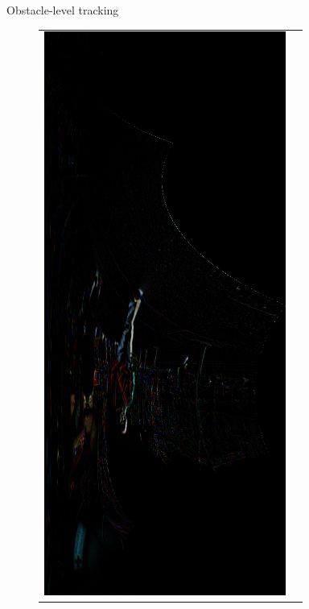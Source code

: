 \begin{frame}[plain]{Obstacle-level tracking}
\begin{overlayarea}{\textwidth}{\textheight}
{\begin{figure}
\begin{tabular}{ cc }
	\includegraphics[height=0.7\textheight]{polarDiff}\label{fig:cp04_polarDiff}
      \end{tabular}
    \end{figure}
    }
    \end{overlayarea}
  \note {
  
  }
\end{frame}

